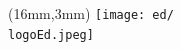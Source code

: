\newcommand{\PhDTitleEN}{Study of dark energy using \lya{} forest from eBOSS}													%
\newcommand{\keywordsEN}{3 à 6 mots clés}														%
\newcommand{\abstractEN}{\lipsum[1-3]}															%

\label{layout_last}

\pagestyle{empty}

\begin{textblock*}{61mm}(16mm,3mm)
	\noindent\texttt{[image: ed/\\logoEd.jpeg]}
\end{textblock*}



